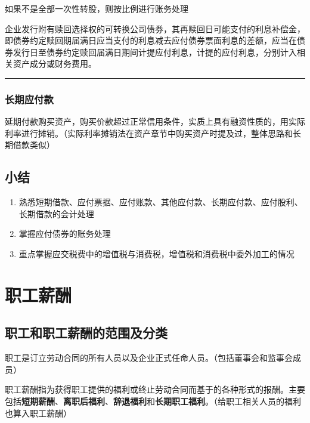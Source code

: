 \documentclass[UTF8,12pt]{ctexart}
\numberwithin{equation}{section} %
\numberwithin{figure}{section}
\numberwithin{table}{section}
\begin{document}
	如果不是全部一次性转股，则按比例进行账务处理  
	
	企业发行附有赎回选择权的可转换公司债券，其再赎回日可能支付的利息补偿金，即债券约定赎回期届满日应当支付的利息减去应付债券票面利息的差额，应当在债券发行日至债券约定赎回届满日期间计提应付利息，计提的应付利息，分别计入相关资产成分或财务费用。
	
	\vspace{5pt}
	\hrule
	\vspace{5pt}
	
	\subsubsection{长期应付款}
	延期付款购买资产，购买价款超过正常信用条件，实质上具有融资性质的，用实际利率进行摊销。（实际利率摊销法在资产章节中购买资产时提及过，整体思路和长期借款类似）
	
	\subsection{小结}
	\begin{enumerate}
		\item 熟悉短期借款、应付票据、应付账款、其他应付款、长期应付款、应付股利、长期借款的会计处理
		
		\item 掌握应付债券的账务处理
		
		\item 重点掌握应交税费中的增值税与消费税，增值税和消费税中委外加工的情况
	\end{enumerate}
	
	\newpage
	\section{职工薪酬}
	
	\subsection{职工和职工薪酬的范围及分类}
	职工是订立劳动合同的所有人员以及企业正式任命人员。（包括董事会和监事会成员）
	
	职工薪酬指为获得职工提供的福利或终止劳动合同而基于的各种形式的报酬。主要包括\textbf{短期薪酬}、\textbf{离职后福利}、\textbf{辞退福利}和\textbf{长期职工福利}。（给职工相关人员的福利也算入职工薪酬）
	
\end{document}

